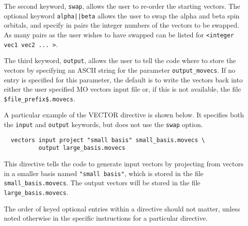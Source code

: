 The second keyword, \verb+swap+, allows the user to re-order the
starting vectors.  The optional keyword \verb+alpha||beta+ allows the
user to swap the alpha and beta spin orbitals, and specify in pairs
the integer numbers of the vectors to be swapped.  As many pairs as
the user wishes to have swapped can be listed for {\tt <integer vec1
vec2 ... >}.

The third keyword, \verb+output+, allows the user to tell the code
where to store the vectors by specifying an ASCII string for the
parameter {\tt output\_movecs}.  If no entry is specified for this
parameter, the default is to write the vectors back into either the user
specified MO vectors input file or, if this is not available, the file
\verb+$file_prefix$.movecs+.

A particular example of the VECTOR directive is shown below.  It specifies
both the \verb+input+ and \verb+output+ keywords, but does not use the 
\verb+swap+ option.

\begin{verbatim}
  vectors input project "small basis" small_basis.movecs \
          output large_basis.movecs
\end{verbatim}

This directive tells the code to generate input vectors by projecting
from vectors in a smaller basis named \verb+"small basis"+, which is
stored in the file \verb+small_basis.movecs+.  The output vectors will be
stored in the file \verb+large_basis.movecs+.

The order of keyed optional entries within a directive should not matter,
unless noted otherwise in the specific instructions for a particular
directive.

